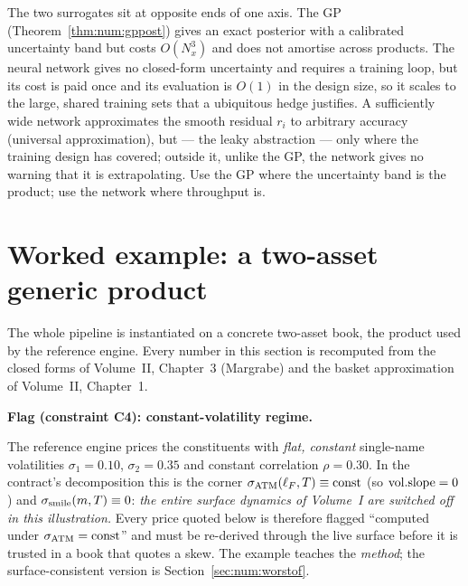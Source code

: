 \begin{remark}
\label{rem:num:gpvsnn}
The two surrogates sit at opposite ends of one axis. The GP
(Theorem~\ref{thm:num:gppost}) gives an exact posterior with a calibrated
uncertainty band but costs $O(N_{x}^3)$ and does not amortise across products. The
neural network gives no closed-form uncertainty and requires a training loop, but
its cost is paid once and its evaluation is $O(1)$ in the design size, so it
scales to the large, shared training sets that a ubiquitous hedge justifies. A
sufficiently wide network approximates the smooth residual $r_i$ to arbitrary
accuracy (universal approximation), but --- the leaky abstraction --- only where
the training design has covered; outside it, unlike the GP, the network gives no
warning that it is extrapolating. Use the GP where the uncertainty band is the
product; use the network where throughput is.
\end{remark}

\section{Worked example: a two-asset generic product}
\label{sec:num:example}

The whole pipeline is instantiated on a concrete two-asset book, the product used
by the reference engine. Every number in this section is recomputed from the
closed forms of Volume~II, Chapter~3 (Margrabe) and the basket approximation of
Volume~II, Chapter~1.

\begin{flushleft}\bfseries
Flag (constraint C4): constant-volatility regime.
\end{flushleft}
The reference engine prices the constituents with \emph{flat, constant}
single-name volatilities $\sigma_1 = 0.10$, $\sigma_2 = 0.35$ and constant
correlation $\rho = 0.30$. In the contract's decomposition this is the corner
$\sigma_{\mathrm{ATM}}(\ell_F,T) \equiv \mathrm{const}$ (so $\mathrm{vol.slope} = 0$) and
$\sigma_{\mathrm{smile}}(m,T) \equiv 0$: \emph{the entire surface dynamics of Volume~I are
switched off in this illustration.} Every price quoted below is therefore
flagged ``computed under $\sigma_{\mathrm{ATM}} = \text{const}$'' and must be re-derived through
the live surface before it is trusted in a book that quotes a skew. The example
teaches the \emph{method}; the surface-consistent version is
Section~\ref{sec:num:worstof}.

